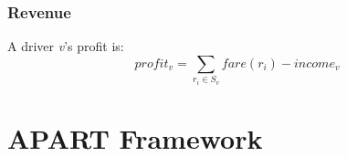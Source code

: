 \documentclass[t]{beamer}
\begin{document}
\begin{frame}\frametitle{Revenue}
A driver \textit{v}'s profit is:
\begin{equation*}
profit_v = \sum_{r_i \in S_v}fare(r_i) - income_v
\end{equation*}
\vspace{0.5in}
\end{frame}

\section{APART Framework}
\end{document}
